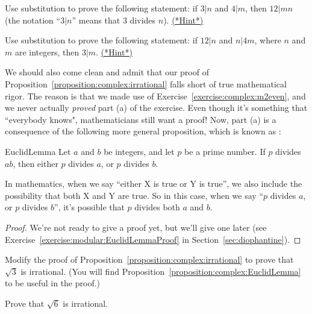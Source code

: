 \begin{exercise}{2}
Use substitution to prove the following statement:  if $3 | n$ and $4 | m$, then $12 | mn$ (the notation ``$3 | n$'' means that 3 divides $n$). 
\hyperref[sec:complex:hints]{(*Hint*)}
\end{exercise}

\begin{exercise}{3}
Use substitution to prove the following statement:  if $12 | n$ and $n | 4m$, where $n$ and $m$ are integers, then $3 | m$.
\hyperref[sec:complex:hints]{(*Hint*)}
\end{exercise}

We should also come clean and admit that our proof of Proposition~\ref{proposition:complex:irrational} falls short of true mathematical rigor. The reason is that we made use of Exercise~\ref{exercise:complex:m2even}, and we never actually \emph{proved} part (a) of the exercise. Even though it's something that ``everybody knows", mathematicians still want a proof! Now, part (a) is a consequence of the following more general proposition, which is known as :

\begin{prop}{EuclidLemma}
Let $a$ and $b$ be integers, and let $p$ be a prime number. If $p$ divides $ab$, then either $p$ divides $a$, or $p$ divides $b$.

\begin{rem}
In mathematics, when we say ``either X is true or Y is true'', we also include the possibility that both X and Y are true. So in this case, when we say ``$p$ divides $a$, or $p$ divides $b$'', it's possible that $p$ divides both $a$ and $b$.
\end{rem}

\end{prop}
\begin{proof}
We're not ready to give a proof yet, but we'll give one later (see Exercise~\ref{exercise:modular:EuclidLemmaProof}  in Section~\ref{sec:diophantine}).
\end{proof}


\begin{exercise}{4}
Modify the proof of Proposition~\ref{proposition:complex:irrational} to prove that $\sqrt{3}$ is irrational. (You will find Proposition~\ref{proposition:complex:EuclidLemma} to be useful in the proof.)
\end{exercise}

\begin{exercise}{5}
Prove that $\sqrt{6}$ is irrational.
\end{exercise}

